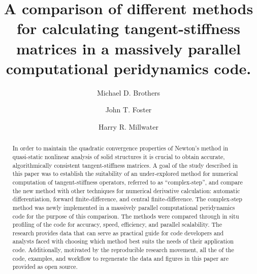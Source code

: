 \documentclass[preprint,12pt]{elsarticle}
\begin{document}
\sloppy

\begin{frontmatter}


\author{Michael D. Brothers}
\author{John T. Foster}

\author{Harry R. Millwater\corref{}}
\address{Mechanical Engineering Department, The University of Texas at San Antonio}


\title{A comparison of different methods for calculating tangent-stiffness matrices in a massively parallel computational peridynamics code.}


\begin{abstract} %
In order to maintain the quadratic convergence properties of Newton's method in quasi-static nonlinear analysis of solid structures it is crucial to obtain accurate, algorithmically consistent tangent-stiffness matrices. A goal of the study described in this paper was to establish the suitability of an under-explored method for numerical computation of tangent-stiffness operators, referred to as ``complex-step'', and compare the new method with other techniques for numerical derivative calculation: automatic differentiation, forward finite-difference, and central finite-difference. The complex-step method was newly implemented in a massively parallel computational peridynamics code for the purpose of this comparison. The methods were compared through in situ profiling of the code for accuracy, speed, efficiency, and parallel scalability. The research provides data that can serve as practical guide for code developers and analysts faced with choosing which method best suits the needs of their application code. Additionally, motivated by the reproducible research movement, all the of the code, examples, and workflow to regenerate the data and figures in this paper are provided as open source.



\end{abstract}
\end{frontmatter}
\end{document}
